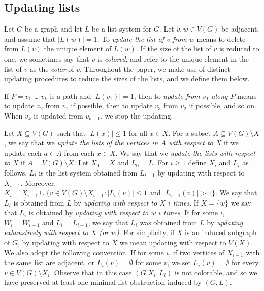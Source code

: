 \documentclass[11pt]{article}
\begin{document}
\subsection{Updating lists}


Let $G$ be a graph and let $L$ be a list system for $G$.
Let $v,w \in V(G)$ be adjacent, and assume that $|L(w)|=1$.
To \emph{update  the list of $v$ from $w$} means to delete
from  $L(v)$ the unique element of $L(w)$.
If the size of the list of $v$ is reduced to one, we sometimes say that
$v$ is {\em colored}, and refer to the unique element in the list of $v$
as the {\em color} of $v$.
Throughout the paper, we make use of distinct updating procedures to reduce 
the sizes of the lists, and we define them below.

If $P=v_1$-\ldots-$v_k$ is a path and $|L(v_1)|=1$, then to \emph{update from $v_1$ along $P$} means to update $v_2$ from $v_1$ if possible,  then to  update $v_3$ from $v_2$ if possible, and so on. When $v_k$ is updated from $v_{k-1}$, we stop the updating.

Let $X\subseteq V(G)$ such that $|L(x)| \leq 1$ for all $x\in X$. 
For a subset $A\subseteq V(G)\setminus X$, we say that we \emph{update the lists of the vertices in $A$ with respect to $X$} if we update each $a \in A$ from each $x \in X$. 
We say that we \emph{update the lists with respect to $X$} if $A=V(G)\setminus X$. 
Let $X_0=X$ and $L_0=L$. 
For $i \geq 1$ define  $X_i$ and $L_i$ as follows. $L_i$ is the list system 
obtained from $L_{i-1}$ by updating with respect to $X_{i-1}$. 
Moreover, $X_i=X_{i-1} \cup \{v \in V(G) \setminus X_{i-1} : |L_i(v)| \leq 1\text{ and } |L_{i-1}(v)|>1\}$.
We say that $L_i$ is obtained from $L$ by {\em updating with respect to  
	$X$ $i$ times}.
If $X=\{w\}$  we say that $L_i$ is obtained by {\em updating with respect to $w$
	$i$ times}. If for some $i$, $W_i=W_{i-1}$ and $L_i=L_{i-1}$, we say
that $L_i$ was  obtained from $L$  by {\em updating exhaustively with respect 
to $X$ (or $w$)}. For simplicity, if $X$ is an induced subgraph of $G$, by updating with respect to $X$ we mean updating with respect to $V(X)$.  
We also adopt the following convention. If for some $i$,
if two vertices of $X_{i-1}$ with the same list are adjacent, or
$L_i(v) = \emptyset$ for some $v$, we set
$L_i(v)=\emptyset$ for every $v \in V(G) \setminus X_i$.  Observe that in this 
case $(G|X_i, L_i)$ is not colorable, and so we have preserved at least one
minimal list obstruction induced by $(G,L)$.
\end{document}
